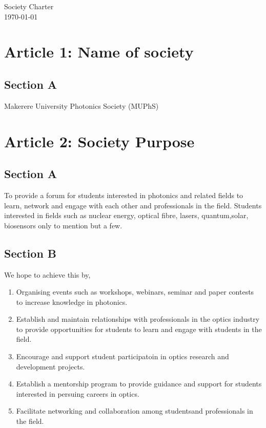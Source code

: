 \documentclass[a4paper,14pt]{article}
\begin{document}
    {\LARGE\bf\begin{center}
        Society Charter\\
        {\today}
    \end{center}}

    \section*{Article 1: Name of society}
    \subsection*{Section A}
    Makerere University Photonics Society (MUPhS)

    \section*{Article 2: Society Purpose}
    \subsection*{Section A}%
    To provide a forum for students interested in photonics and related fields to learn, network and engage with each other and professionals in the field.
    Students interested in fields such as nuclear energy, optical fibre, lasers, quantum,solar, biosensors only to mention but a few.
    \subsection*{Section B}%
    We hope to achieve this by,
    \begin{enumerate}
        \item Organising events such as workshops, webinars, seminar and paper contests to increase knowledge in photonics.
        \item Establish and maintain relationships with professionals in the optics industry to provide opportunities for students to learn and engage with students in the field.
        \item Encourage and support student participatoin in optics research and development projects.
        \item Establish a mentorship program to provide guidance and support for students interested in persuing careers in optics.
        \item Facilitate networking and collaboration among studentsand professionals in the field.
    \end{enumerate}
\end{document}
